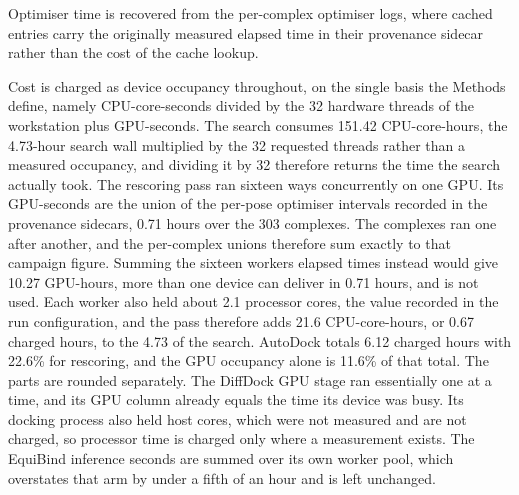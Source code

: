  Optimiser time is recovered from the per-complex optimiser logs, where cached entries carry the originally measured elapsed time in their provenance sidecar rather than the cost of the cache lookup.

Cost is charged as device occupancy throughout, on the single basis the Methods define, namely CPU-core-seconds divided by the 32 hardware threads of the workstation plus GPU-seconds. The search consumes 151.42 CPU-core-hours, the 4.73-hour search wall multiplied by the 32 requested threads rather than a measured occupancy, and dividing it by 32 therefore returns the time the search actually took. The rescoring pass ran sixteen ways concurrently on one GPU. Its GPU-seconds are the union of the per-pose optimiser intervals recorded in the provenance sidecars, 0.71 hours over the 303 complexes. The complexes ran one after another, and the per-complex unions therefore sum exactly to that campaign figure. Summing the sixteen workers\textquotesingle{} elapsed times instead would give 10.27 GPU-hours, more than one device can deliver in 0.71 hours, and is not used. Each worker also held about 2.1 processor cores, the value recorded in the run configuration, and the pass therefore adds 21.6 CPU-core-hours, or 0.67 charged hours, to the 4.73 of the search. AutoDock totals 6.12 charged hours with 22.6\% for rescoring, and the GPU occupancy alone is 11.6\% of that total. The parts are rounded separately. The DiffDock GPU stage ran essentially one at a time, and its GPU column already equals the time its device was busy. Its docking process also held host cores, which were not measured and are not charged, so processor time is charged only where a measurement exists. The EquiBind inference seconds are summed over its own worker pool, which overstates that arm by under a fifth of an hour and is left unchanged.

